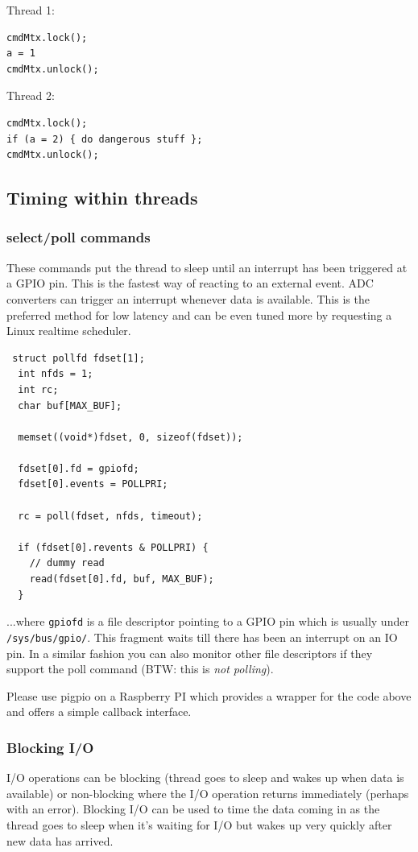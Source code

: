 \documentclass[12pt]{report}
\begin{document}
Thread 1:
\begin{verbatim}
cmdMtx.lock();
a = 1
cmdMtx.unlock();
\end{verbatim}

Thread 2:
\begin{verbatim}
cmdMtx.lock();
if (a = 2) { do dangerous stuff };
cmdMtx.unlock();
\end{verbatim}




\subsection{Timing within threads}

\subsubsection{select/poll commands}
These commands put the thread to sleep until an interrupt has been
triggered at a GPIO pin. This is the fastest way of reacting to an
external event. ADC converters can trigger an interrupt whenever data
is available.  This is the preferred method for low latency and can be
even tuned more by requesting a Linux realtime scheduler.
\begin{verbatim}
 struct pollfd fdset[1];
  int nfds = 1;
  int rc;
  char buf[MAX_BUF];

  memset((void*)fdset, 0, sizeof(fdset));

  fdset[0].fd = gpiofd;
  fdset[0].events = POLLPRI;

  rc = poll(fdset, nfds, timeout);

  if (fdset[0].revents & POLLPRI) {
    // dummy read
    read(fdset[0].fd, buf, MAX_BUF);
  }
\end{verbatim}
...where \texttt{gpiofd} is a file descriptor pointing to a GPIO pin
which is usually under \texttt{/sys/bus/gpio/}. This fragment
waits till there has been an interrupt on an IO pin. In a similar
fashion you can also monitor other file descriptors if they
support the poll command (BTW: this is \textsl{not polling}).

Please use pigpio on a Raspberry PI which provides a wrapper
for the code above and offers a simple callback interface.


\subsubsection{Blocking I/O}
I/O operations can be blocking (thread goes to sleep and wakes up when
data is available) or non-blocking where the I/O operation returns
immediately (perhaps with an error). Blocking I/O can be used to time
the data coming in as the thread goes to sleep when it's waiting for
I/O but wakes up very quickly after new data has arrived.
\end{document}
